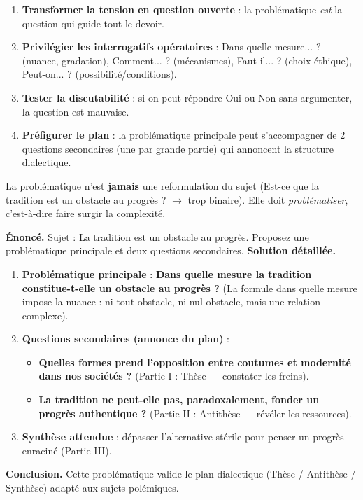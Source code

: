\documentclass[11pt]{article}
\begin{document}
\begin{methode}
\begin{enumerate}
\item \textbf{Transformer la tension en question ouverte} : la problématique \emph{est} la question qui guide tout le devoir.
\item \textbf{Privilégier les interrogatifs opératoires} : \og Dans quelle mesure... ? \fg{} (nuance, gradation), \og Comment... ? \fg{} (mécanismes), \og Faut-il... ? \fg{} (choix éthique), \og Peut-on... ? \fg{} (possibilité/conditions).
\item \textbf{Tester la discutabilité} : si on peut répondre \og Oui \fg{} ou \og Non \fg{} sans argumenter, la question est mauvaise.
\item \textbf{Préfigurer le plan} : la problématique principale peut s'accompagner de 2 questions secondaires (une par grande partie) qui annoncent la structure dialectique.
\end{enumerate}
\begin{attention}
La problématique n'est \textbf{jamais} une reformulation du sujet (\og Est-ce que la tradition est un obstacle au progrès ? \fg{} $\rightarrow$ trop binaire). Elle doit \emph{problématiser}, c'est-à-dire faire surgir la complexité.
\end{attention}
\end{methode}

\begin{exoresolu}
\textbf{Énoncé.} Sujet : \og La tradition est un obstacle au progrès. \fg{} Proposez une problématique principale et deux questions secondaires.
\tcblower
\textbf{Solution détaillée.}
\begin{enumerate}
\item \textbf{Problématique principale} : \og \textbf{Dans quelle mesure la tradition constitue-t-elle un obstacle au progrès ?} \fg{} (La formule \og dans quelle mesure \fg{} impose la nuance : ni tout obstacle, ni nul obstacle, mais une relation complexe).
\item \textbf{Questions secondaires (annonce du plan)} :
\begin{itemize}
\item \og \textbf{Quelles formes prend l'opposition entre coutumes et modernité dans nos sociétés ?} \fg{} (Partie I : Thèse — constater les freins).
\item \og \textbf{La tradition ne peut-elle pas, paradoxalement, fonder un progrès authentique ?} \fg{} (Partie II : Antithèse — révéler les ressources).
\end{itemize}
\item \textbf{Synthèse attendue} : dépasser l'alternative stérile pour penser un \og progrès enraciné \fg{} (Partie III).
\end{enumerate}
\textbf{Conclusion.} Cette problématique valide le plan dialectique (Thèse / Antithèse / Synthèse) adapté aux sujets polémiques.
\end{exoresolu}
\end{document}
